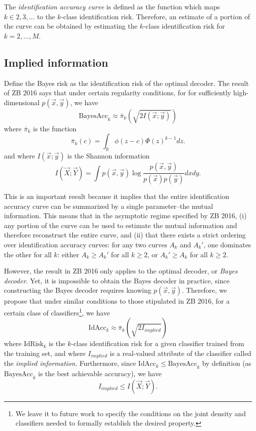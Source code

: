 \documentclass[12pt]{article}
\begin{document}
The \emph{identification accuracy curve} is defined as the function which maps $k \in 2,3,\hdots$ to the $k$-class identification risk.  Therefore, an estimate of a portion of the curve can be obtained by estimating the $k$-class identification risk for $k = 2,\hdots, M$.

\subsection{Implied information}

Define the Bayes risk as the identification risk of the optimal decoder.  The result of ZB 2016 says that under certain regularity conditions, for for sufficiently high-dimensional $p(\vec{x}, \vec{y})$, we have
\[
\text{BayesAcc}_k \approx \bar{\pi}_k(\sqrt{2 I(\vec{x}; \vec{y})})
\]
where $\bar{\pi}_k$ is the function
\[
\bar{\pi}_k(c) = \int_{\mathbb{R}} \phi(z - c)  \Phi(z)^{k-1} dz.
\]
and where $I(\vec{x}; \vec{y})$ is the Shannon information
\[
I(\vec{X};\vec{Y}) = \int p(\vec{x}, \vec{y}) \log \frac{p(\vec{x}, \vec{y})}{p(\vec{x})p(\vec{y})}dxdy.
\]

This is an important result because it implies that the entire identification accuracy curve can be summarized by a single parameter--the mutual information.  This means that in the asymptotic regime specified by ZB 2016, (i) any portion of the curve can be used to estimate the mutual information and therefore reconstruct the entire curve, and (ii) that there exists a strict ordering over identification accuracy curves: for any two curves $A_k$ and $A_k'$, one dominates the other for all $k$: either $A_k \geq A_k'$ for all $k \geq 2$, or $A_k' \geq A_k$ for all $k \geq 2$.

However, the result in ZB 2016 only applies to the optimal decoder, or \emph{Bayes decoder}.  Yet, it is impossible to obtain the Bayes decoder in practice, since constructing the Bayes decoder requires knowing $p(\vec{x}, \vec{y})$.  Therefore, we propose that under similar conditions to those stipulated in ZB 2016, for a certain class of classifiers\footnote{We leave it to future work to specify the conditions on the joint density and classifiers needed to formally establish the desired property.}, we have
\[
\text{IdAcc}_k \approx \bar{\pi}_k(\sqrt{2 I_{implied}})
\]
where $\text{IdRisk}_k$ is the $k$-class identification risk for a given classifier trained from the training set,
and where $I_{implied}$ is a real-valued attribute of the classifier called the \emph{implied information}.
Furthermore, since $\text{IdAcc}_k \leq \text{BayesAcc}_k$ by definition (as $\text{BayesAcc}_k$ is the best achievable accuracy), we have
\[
I_{implied} \leq I(\vec{X}; \vec{Y}).
\]
\end{document}
